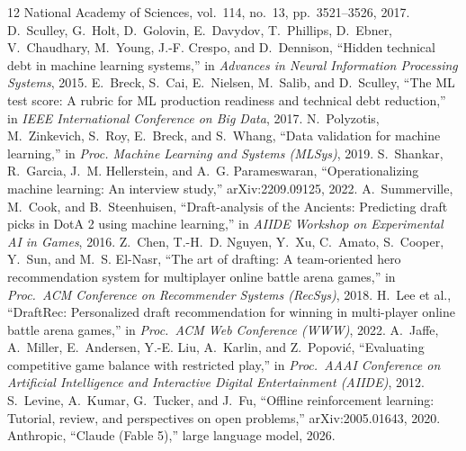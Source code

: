 \documentclass[journal]{IEEEtran}
\begin{document}
\begin{thebibliography}{12}
{National Academy of Sciences}, vol.~114, no.~13, pp.~3521--3526, 2017.
 D.~Sculley, G.~Holt, D.~Golovin, E.~Davydov,
T.~Phillips, D.~Ebner, V.~Chaudhary, M.~Young, J.-F. Crespo, and
D.~Dennison, ``Hidden technical debt in machine learning systems,'' in
\emph{Advances in Neural Information Processing Systems}, 2015.
 E.~Breck, S.~Cai, E.~Nielsen, M.~Salib, and
D.~Sculley, ``The ML test score: A rubric for ML production readiness
and technical debt reduction,'' in \emph{IEEE International Conference
on Big Data}, 2017.
 N.~Polyzotis, M.~Zinkevich, S.~Roy,
E.~Breck, and S.~Whang, ``Data validation for machine learning,'' in
\emph{Proc. Machine Learning and Systems (MLSys)}, 2019.
 S.~Shankar, R.~Garcia, J.~M.
Hellerstein, and A.~G. Parameswaran, ``Operationalizing machine
learning: An interview study,'' arXiv:2209.09125, 2022.
 A.~Summerville, M.~Cook, and
B.~Steenhuisen, ``Draft-analysis of the Ancients: Predicting draft
picks in DotA 2 using machine learning,'' in \emph{AIIDE Workshop on
Experimental AI in Games}, 2016.
 Z.~Chen, T.-H.~D. Nguyen, Y.~Xu, C.~Amato,
S.~Cooper, Y.~Sun, and M.~S. El-Nasr, ``The art of drafting: A
team-oriented hero recommendation system for multiplayer online battle
arena games,'' in \emph{Proc.\ ACM Conference on Recommender Systems
(RecSys)}, 2018.
 H.~Lee et al., ``DraftRec: Personalized draft
recommendation for winning in multi-player online battle arena games,''
in \emph{Proc.\ ACM Web Conference (WWW)}, 2022.
 A.~Jaffe, A.~Miller, E.~Andersen, Y.-E.
Liu, A.~Karlin, and Z.~Popovi\'c, ``Evaluating competitive game balance
with restricted play,'' in \emph{Proc.\ AAAI Conference on Artificial
Intelligence and Interactive Digital Entertainment (AIIDE)}, 2012.
 S.~Levine, A.~Kumar, G.~Tucker, and J.~Fu,
``Offline reinforcement learning: Tutorial, review, and perspectives on
open problems,'' arXiv:2005.01643, 2020.
 Anthropic, ``Claude (Fable 5),'' large language model,
2026.
\end{thebibliography}
\end{document}
